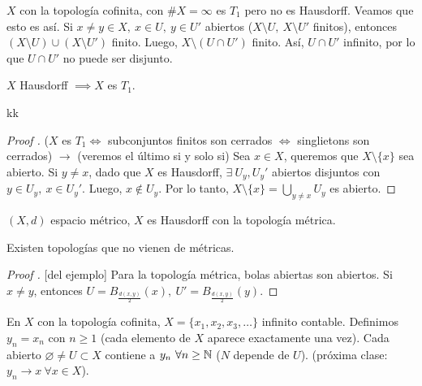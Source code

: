 	\begin{eg}
		$X$ con la topología cofinita, con $\# X = \infty$ es $T_1$ pero no es Hausdorff. Veamos que esto es así. Si $x \neq y \in X,\ x \in U,\ y \in U'$ abiertos ($X \setminus U,\ X \setminus U'$ finitos), entonces $(X \setminus U) \cup (X \setminus U')$ finito. Luego, $X \setminus (U \cap U')$ finito. Así, $U \cap U'$ infinito, por lo que $U \cap U'$ no puede ser disjunto.  
	\end{eg}

	\begin{lemma}
		$X$ Hausdorff $\implies X$ es $T_1$.
	\end{lemma}
kk
	\begin{proof}[Proof ]
		($X$ es $T_1 \iff$ subconjuntos finitos son cerrados $\iff$ singlietons son cerrados) $\rightarrow$ (veremos el último si y solo si) Sea $x \in X$, queremos que $X \setminus \{x\}$ sea abierto. Si $y \neq x$, dado que $X$ es Hausdorff, $\exists\ U_y, U_y'$ abiertos disjuntos con $y \in U_y,\ x \in U_y'$. Luego, $x \not\in U_y$. Por lo tanto, $X \setminus \{ x \} = \displaystyle\bigcup_{y \neq x} U_y$ es abierto.
	\end{proof}

	\begin{eg}
		$(X,d)$ espacio métrico, $X$ es Hausdorff con la topología métrica.
	\end{eg}

	\begin{corollary}[secreto]
		Existen topologías que no vienen de métricas.
	\end{corollary}

	\begin{proof}[Proof ][del ejemplo]
		Para la topología métrica, bolas abiertas son abiertos. Si $x \neq y$, entonces $U = B_{\frac{d(x,y)}{2}}(x),\ U' = B_{\frac{d(x,y)}{2}}(y)$.
	\end{proof}

	En $X$ con la topología cofinita, $X = \{ x_1, x_2, x_3,\dots \}$ infinito contable. Definimos $y_n = x_n$ con $n \geq 1$ (cada elemento de $X$ aparece exactamente una vez). Cada abierto $\varnothing \neq U \subset X$ contiene a $y_n \ \forall n \geq \mathbb{N}$ ($N$ depende de $U$). (próxima clase: $y_n \to x \ \forall x \in X$). 
